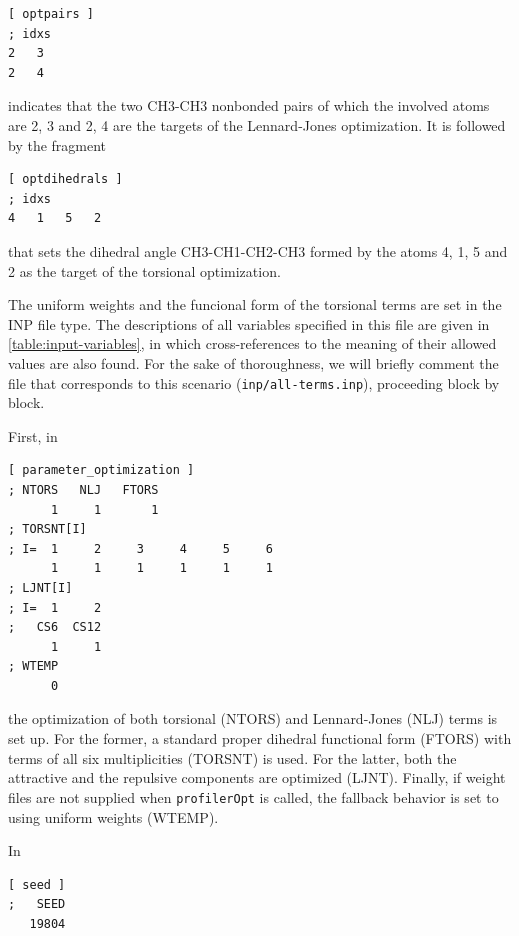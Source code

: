 \documentclass[10pt,a4paper,openany]{memoir}
\numberwithin{equation}{section}
\newcommand{\profileropt}[0]{\texttt{profilerOpt}}
\begin{document}
\begin{lstlisting}[language=gromacs]
[ optpairs ]
; idxs
2   3
2   4
\end{lstlisting}\vspace{1ex}\par

\noindent indicates that the two CH3-CH3 nonbonded pairs of which the
involved atoms are 2, 3 and 2, 4 are the targets of the Lennard-Jones
optimization. It is followed by the fragment
%

\begin{lstlisting}[language=gromacs]
[ optdihedrals ]
; idxs
4   1   5   2   
\end{lstlisting}\vspace{1ex}\par

\noindent that sets the dihedral angle CH3-CH1-CH2-CH3 formed by the
atoms 4, 1, 5 and 2 as the target of the torsional optimization.

The uniform weights and the funcional form of the torsional terms are
set in the INP file type.
%
The descriptions of all variables specified in this file are given in
\autoref{table:input-variables}, in which cross-references to the
meaning of their allowed values are also found.
%
For the sake of thoroughness, we will briefly comment the file that
corresponds to this scenario (\texttt{inp/all-terms.inp}), proceeding
block by block.

First, in

\begin{lstlisting}[language=gromacs]
[ parameter_optimization ]
; NTORS   NLJ   FTORS
      1     1       1    
; TORSNT[I]
; I=  1     2     3     4     5     6
      1     1     1     1     1     1
; LJNT[I]
; I=  1     2
;   CS6  CS12
      1     1
; WTEMP
      0
\end{lstlisting}\vspace{1ex}\par

\noindent the optimization of both torsional (NTORS) and
Lennard-Jones (NLJ) terms is set up.
%
For the former, a standard proper dihedral functional form (FTORS)
with terms of all six multiplicities (TORSNT) is used.
%
For the latter, both the attractive and the repulsive components are
optimized (LJNT).
%
Finally, if weight files are not supplied when \profileropt{} is
called, the fallback behavior is set to using uniform weights (WTEMP).

In

\begin{lstlisting}[language=gromacs]
[ seed ]
;   SEED
   19804
\end{lstlisting}\vspace{1ex}\par
\end{document}
